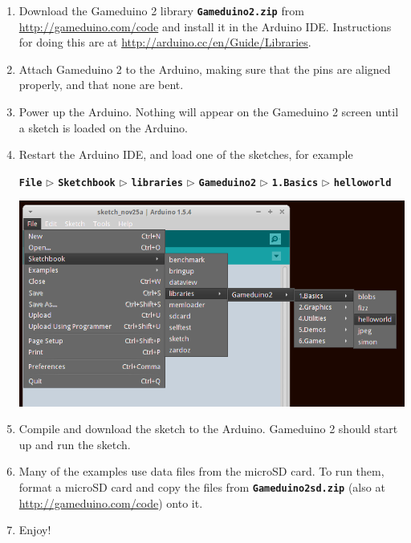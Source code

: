 \documentclass[10pt]{book}
\newcommand{\gdtwo}{Gameduino 2 }
\newcommand{\mach}[1]{\texttt{\textbf{#1}}}
\begin{document}
\begin{enumerate}

\item
Download the \gdtwo library \mach{Gameduino2.zip} from \\
\url{http://gameduino.com/code} and install it in the Arduino IDE.
Instructions for doing this are at
\url{http://arduino.cc/en/Guide/Libraries}.

\item
Attach \gdtwo to the Arduino, making sure that the pins are aligned properly,
and that none are bent.

\item
Power up the Arduino. Nothing will appear on the \gdtwo screen until a sketch is loaded on the Arduino.

\item
Restart the Arduino IDE, and load one of the sketches, for example \\
\begin{small}
\mach{File} $\triangleright$
\mach{Sketchbook} $\triangleright$
\mach{libraries} $\triangleright$
\mach{Gameduino2} $\triangleright$
\mach{1.Basics} $\triangleright$
\mach{helloworld}
\end{small}

\begin{center}
\includegraphics[width=1.0\textwidth]{assets/menu.png}
\end{center}

\item
Compile and download the sketch to the Arduino.
\gdtwo should start up and run the sketch.

\item
Many of the examples use data files from the microSD card.
To run them, format a microSD card and copy the files
from \mach{Gameduino2sd.zip} (also at \url{http://gameduino.com/code})
onto it.

\item
Enjoy!

\end{enumerate}
\end{document}
